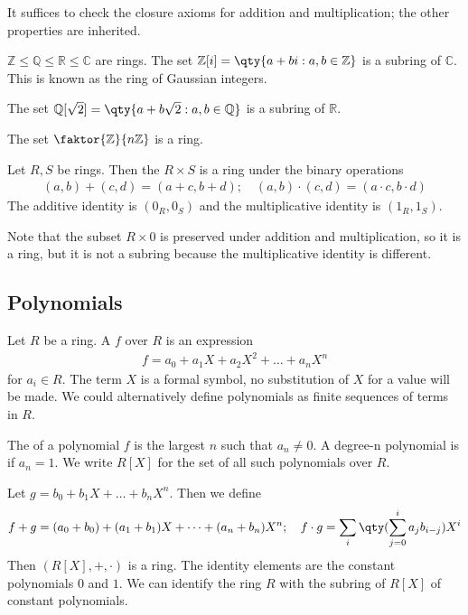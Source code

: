 \begin{remark}
	It suffices to check the closure axioms for addition and multiplication; the other properties are inherited.
\end{remark}

\begin{example}
	$\mathbb Z \leq \mathbb Q \leq \mathbb R \leq \mathbb C$ are rings.
	The set $\mathbb Z[i] = \qty{a+bi : a,b\in\mathbb Z}$ is a subring of $\mathbb C$.
	This is known as the ring of Gaussian integers.
\end{example}

\begin{example}
	The set $\mathbb Q[\sqrt{2}] = \qty{a+b\sqrt{2} : a,b \in\mathbb Q}$ is a subring of $\mathbb R$.
\end{example} 

\begin{example}
	The set $\faktor{\mathbb Z}{n\mathbb Z}$ is a ring.
\end{example}

\begin{example}
	Let $R, S$ be rings.
	Then the  $R \times S$ is a ring under the binary operations
	\begin{align*}
		(a,b) + (c,d) = (a+c,b+d);\quad (a,b) \cdot (c,d) = (a\cdot c,b\cdot d)
	\end{align*}
	The additive identity is $(0_R, 0_S)$ and the multiplicative identity is $(1_R, 1_S)$.

	Note that the subset $R \times \qty{0}$ is preserved under addition and multiplication, so it is a ring, but it is not a subring because the multiplicative identity is different.
\end{example}

\subsection{Polynomials}
\begin{definition}[Polynomial]
	Let $R$ be a ring.
	A  $f$ over $R$ is an expression
	\begin{align*}
		f = a_0 + a_1 X + a_2 X^2 + \dots + a_n X^n
	\end{align*}
	for $a_i \in R$.
	The term $X$ is a formal symbol, no substitution of $X$ for a value will be made.
	We could alternatively define polynomials as finite sequences of terms in $R$.

	The  of a polynomial $f$ is the largest $n$ such that $a_n \neq 0$.
	A degree-n polynomial is  if $a_n = 1$.
	We write $R[X]$ for the set of all such polynomials over $R$.

	Let $g = b_0 + b_1 X + \dots + b_n X^n$.
	Then we define
	\begin{align*}
		f + g = (a_0 + b_0) + (a_1 + b_1) X + \dots + (a_n + b_n) X^n;\quad f \cdot g = \sum_i \qty(\sum_{j=0}^i a_j b_{i-j}) X^i
	\end{align*}
	Then $(R[X], +, \cdot)$ is a ring.
	The identity elements are the constant polynomials $0$ and $1$.
	We can identify the ring $R$ with the subring of $R[X]$ of constant polynomials.
\end{definition}


